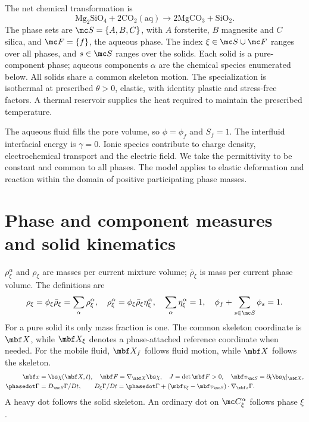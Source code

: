 \documentclass[11pt]{article}
\begin{document}
The net chemical transformation is
\begin{equation}
 \mathrm{Mg_2SiO_4}+2\mathrm{CO_2(aq)}\longrightarrow
 2\mathrm{MgCO_3}+\mathrm{SiO_2}.
 \label{eq:application_reaction}
\end{equation}
The phase sets are \(\mc S=\{A,B,C\}\), with \(A\) forsterite, \(B\) magnesite and \(C\) silica, and \(\mc F=\{f\}\), the aqueous phase. The index \(\xi\in\mc S\cup\mc F\) ranges over all phases, and \(s\in\mc S\) ranges over the solids. Each solid is a pure-component phase; aqueous components \(\alpha\) are the chemical species enumerated below. All solids share a common skeleton motion. The specialization is isothermal at prescribed \(\theta>0\), elastic, with identity plastic and stress-free factors. A thermal reservoir supplies the heat required to maintain the prescribed temperature.

The aqueous fluid fills the pore volume, so \(\phi=\phi_f\) and \(S_f=1\). The interfluid interfacial energy is \(\gamma=0\). Ionic species contribute to charge density, electrochemical transport and the electric field. We take the permittivity to be constant and common to all phases. The model applies to elastic deformation and reaction within the domain of positive participating phase masses.

\section{Phase and component measures and solid kinematics}
\(\rho_\xi^\alpha\) and \(\rho_\xi\) are masses per current mixture volume; \(\bar\rho_\xi\) is mass per current phase volume. The definitions are
\begin{equation}
 \rho_\xi=\phi_\xi\bar\rho_\xi=\sum_\alpha\rho_\xi^\alpha,
 \quad \rho_\xi^\alpha=\phi_\xi\bar\rho_\xi\eta_\xi^\alpha,
 \quad \sum_\alpha\eta_\xi^\alpha=1,
 \quad \phi_f+\sum_{s\in\mc S}\phi_s=1.
 \label{eq:densities}
\end{equation}
For a pure solid its only mass fraction is one. The common skeleton coordinate is \(\mbf X\), while \(\mbf X_\xi\) denotes a phase-attached reference coordinate when needed. For the mobile fluid, \(\mbf X_f\) follows fluid motion, while \(\mbf X\) follows the skeleton.
\begin{align}
 \mbf x&=\bs\chi(\mbf X,t),\quad \mbf F=\nabla_{\mbf X}\bs\chi,
 \quad J=\det\mbf F>0,\quad \mbf v_{\mc S}=\partial_t\bs\chi|_{\mbf X},\label{eq:motion}\\
 \phasedot\Gamma&=D_{\mc S}\Gamma/Dt,
 \qquad D_\xi\Gamma/Dt=\phasedot\Gamma+
 (\mbf v_\xi-\mbf v_{\mc S})\cdot\nabla_{\mbf x}\Gamma.
 \label{eq:rates}
\end{align}
A heavy dot follows the solid skeleton. An ordinary dot on \(\mc C_\xi^\alpha\) follows phase \(\xi\).
\end{document}
